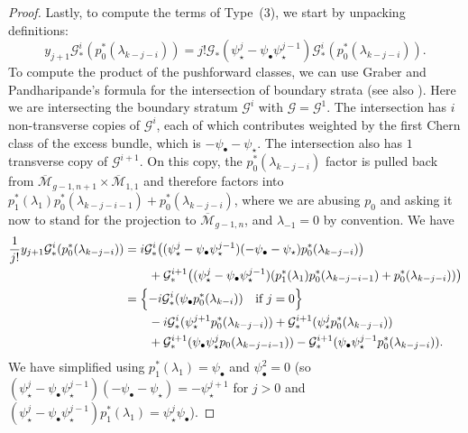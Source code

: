 \documentclass[12pt]{amsart}
\theoremstyle{definition}
\newcommand{\M}{\overline{\mathcal{M}}}
\newcommand{\G}{\mathcal{G}}
\numberwithin{equation}{section}
\begin{document}
\begin{proof}
Lastly, to compute the terms of Type~(3), we start by unpacking definitions:
\[
y_{j+1}\G_*^{i}(p_0^*(\lambda_{k-j-i}))=j!\G_*(\psi_\star^{j}-\psi_\bullet\psi_\star^{j-1})\G_*^{i}(p_0^*(\lambda_{k-j-i})).
\]
To compute the product of the pushforward classes, we can use Graber and Pandharipande's formula for the intersection of boundary strata \cite[Appendix~A.4, Equation~(11)]{GP} (see also \cite[Proposition~1]{Yang}).  Here we are intersecting the boundary stratum $\G^i$ with $\G = \G^1$.  The intersection has $i$ non-transverse copies of $\G^i$, each of which contributes weighted by the first Chern class of the excess bundle, which is $-\psi_\bullet-\psi_\star$.  The intersection also has $1$ transverse copy of $\G^{i+1}$.  On this copy, the $p_0^*(\lambda_{k-j-i})$ factor is pulled back from $\M_{g-1,n+1} \times \M_{1,1}$ and therefore factors into $p_1^*(\lambda_1) p_0^*(\lambda_{k-j-i-1}) + p_0^*(\lambda_{k-j-i})$, where we are abusing $p_0$ and asking it now to stand for the projection to $\M_{g-1,n}$, and $\lambda_{-1}=0$ by convention. We have
\begin{align*}
	\frac{1}{j!}y_{j+1}\G_*^{i}(p_0^*(\lambda_{k-j-i}))&=i\G_*^i\big((\psi_\star^{j}-\psi_\bullet\psi_\star^{j-1})(-\psi_\bullet-\psi_\star)p_0^*(\lambda_{k-j-i})\big)\\
	&\qquad+\G^{i+1}_*\big((\psi_\star^{j}-\psi_\bullet\psi_\star^{j-1})(p_1^*(\lambda_1)p_0^*(\lambda_{k-j-i-1})+p_0^*(\lambda_{k-j-i}))\big)\\
	&= \Bigl\{ - i\G^i_*(\psi_\bullet p_0^*(\lambda_{k-i})) \quad \text{if $j=0$} \Bigr\}
		\\ & \qquad - i \G_*^i(\psi_\star^{j+1} p_0^*(\lambda_{k-j-i})) + \G_*^{i+1}(\psi_\star^j p_0^*(\lambda_{k-j-i})) 
		\\ & \qquad + \G_*^{i+1}(\psi_\bullet\psi_\star^jp_0(\lambda_{k-j-i-1})) - \G_*^{i+1}(\psi_\bullet\psi_\star^{j-1}p_0^*(\lambda_{k-j-i})).
\end{align*}
We have simplified using $p_1^*(\lambda_1)=\psi_\bullet$ and $\psi_\bullet^2=0$ (so $(\psi_\star^j-\psi_\bullet\psi_\star^{j-1})(-\psi_\bullet-\psi_\star)=-\psi_\star^{j+1}$ for $j>0$ and $(\psi_\star^j-\psi_\bullet\psi_\star^{j-1})p_1^*(\lambda_1) = \psi_\star^j\psi_\bullet$).  


\end{proof}
\end{document}
